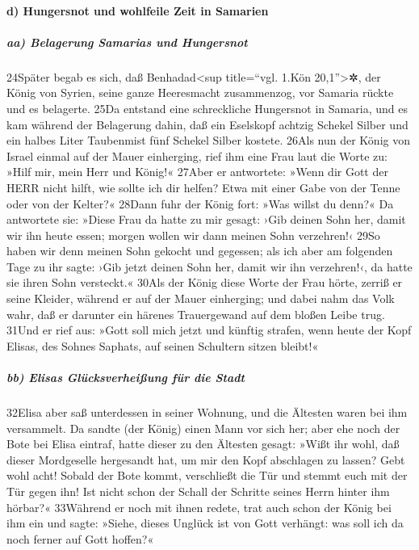 \hypertarget{d-hungersnot-und-wohlfeile-zeit-in-samarien}{%
\paragraph{d) Hungersnot und wohlfeile Zeit in
Samarien}\label{d-hungersnot-und-wohlfeile-zeit-in-samarien}}

\hypertarget{aa-belagerung-samarias-und-hungersnot}{%
\subparagraph{aa) Belagerung Samarias und
Hungersnot}\label{aa-belagerung-samarias-und-hungersnot}}

24Später begab es sich, daß Benhadad\textless sup title=``vgl. 1.Kön
20,1''\textgreater✲, der König von Syrien, seine ganze Heeresmacht
zusammenzog, vor Samaria rückte und es belagerte. 25Da entstand eine
schreckliche Hungersnot in Samaria, und es kam während der Belagerung
dahin, daß ein Eselskopf achtzig Schekel Silber und ein halbes Liter
Taubenmist fünf Schekel Silber kostete. 26Als nun der König von Israel
einmal auf der Mauer einherging, rief ihm eine Frau laut die Worte zu:
»Hilf mir, mein Herr und König!« 27Aber er antwortete: »Wenn dir Gott
der HERR nicht hilft, wie sollte ich dir helfen? Etwa mit einer Gabe von
der Tenne oder von der Kelter?« 28Dann fuhr der König fort: »Was willst
du denn?« Da antwortete sie: »Diese Frau da hatte zu mir gesagt: ›Gib
deinen Sohn her, damit wir ihn heute essen; morgen wollen wir dann
meinen Sohn verzehren!‹ 29So haben wir denn meinen Sohn gekocht und
gegessen; als ich aber am folgenden Tage zu ihr sagte: ›Gib jetzt deinen
Sohn her, damit wir ihn verzehren!‹, da hatte sie ihren Sohn versteckt.«
30Als der König diese Worte der Frau hörte, zerriß er seine Kleider,
während er auf der Mauer einherging; und dabei nahm das Volk wahr, daß
er darunter ein härenes Trauergewand auf dem bloßen Leibe trug. 31Und er
rief aus: »Gott soll mich jetzt und künftig strafen, wenn heute der Kopf
Elisas, des Sohnes Saphats, auf seinen Schultern sitzen bleibt!«

\hypertarget{bb-elisas-gluxfccksverheiuxdfung-fuxfcr-die-stadt}{%
\subparagraph{bb) Elisas Glücksverheißung für die
Stadt}\label{bb-elisas-gluxfccksverheiuxdfung-fuxfcr-die-stadt}}

32Elisa aber saß unterdessen in seiner Wohnung, und die Ältesten waren
bei ihm versammelt. Da sandte (der König) einen Mann vor sich her; aber
ehe noch der Bote bei Elisa eintraf, hatte dieser zu den Ältesten
gesagt: »Wißt ihr wohl, daß dieser Mordgeselle hergesandt hat, um mir
den Kopf abschlagen zu lassen? Gebt wohl acht! Sobald der Bote kommt,
verschließt die Tür und stemmt euch mit der Tür gegen ihn! Ist nicht
schon der Schall der Schritte seines Herrn hinter ihm hörbar?« 33Während
er noch mit ihnen redete, trat auch schon der König bei ihm ein und
sagte: »Siehe, dieses Unglück ist von Gott verhängt: was soll ich da
noch ferner auf Gott hoffen?«

